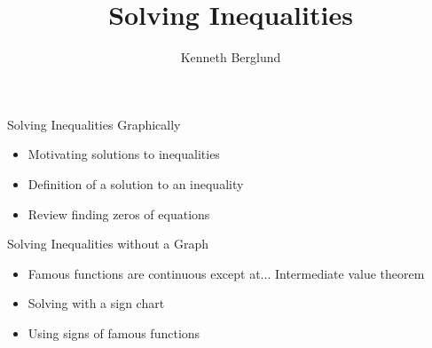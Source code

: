\documentclass{ximera}
\author{Kenneth Berglund}
\title{Solving Inequalities}
\begin{document}
\begin{abstract}
\end{abstract}
\maketitle


\begin{objectives}
\item Solving Inequalities Graphically
\begin{itemize}
	\item Motivating solutions to inequalities
	\item Definition of a solution to an inequality
	\item Review finding zeros of equations
\end{itemize}

\item Solving Inequalities without a Graph
\begin{itemize}
	\item Famous functions are continuous except at... Intermediate value theorem
	\item Solving with a sign chart
	\item Using signs of famous functions
\end{itemize}


\end{objectives}
\end{document}
